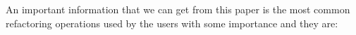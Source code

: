 An important information that we can get from this paper is the most common refactoring operations used by the users with some importance and they are: 





